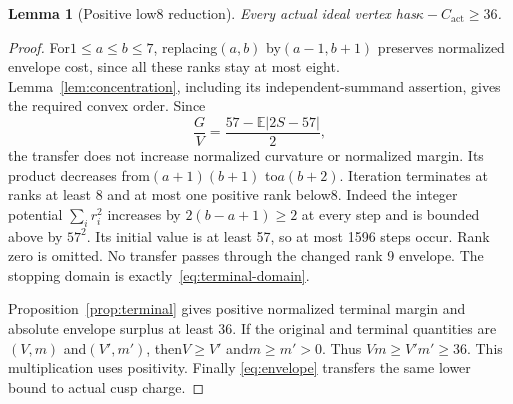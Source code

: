 \documentclass[11pt]{article}
\newtheorem{lemma}[theorem]{Lemma}
\theoremstyle{remark}\newtheorem{remark}[theorem]{Remark}
\newcommand{\act}{\mathrm{act}}
\begin{document}
\begin{lemma}[Positive low8 reduction]\label{lem:low8}
Every actual ideal vertex has$\kappa-C_{\act}\ge36$.
\end{lemma}
\begin{proof}
For$1\le a\le b\le7$, replacing$(a,b)$ by$(a-1,b+1)$ preserves
normalized envelope cost, since all these ranks stay at most eight.
Lemma~\ref{lem:concentration}, including its independent-summand
assertion, gives the required convex order. Since
\[
 \frac GV=\frac{57-\mathbb E|2S-57|}{2},
\]
the transfer does not increase normalized curvature or normalized
margin. Its product decreases from$(a+1)(b+1)$ to$a(b+2)$. Iteration
terminates at ranks at least 8 and at most one positive rank below8.
Indeed the integer potential $\sum_i r_i^2$ increases by
$2(b-a+1)\ge2$ at every step and is bounded above by $57^2$.
Its initial value is at least 57, so at most 1596 steps occur.
Rank zero is omitted. No transfer passes through the changed rank 9
envelope. The stopping domain is exactly~\eqref{eq:terminal-domain}.

Proposition~\ref{prop:terminal} gives positive normalized terminal
margin and absolute envelope surplus at least 36. If the original and terminal quantities
are$(V,m)$ and$(V',m')$, then$V\ge V'$ and$m\ge m'>0$. Thus
$Vm\ge V'm'\ge36$. This multiplication uses positivity. Finally
\eqref{eq:envelope} transfers the same lower bound to actual cusp charge.
\end{proof}
\end{document}
